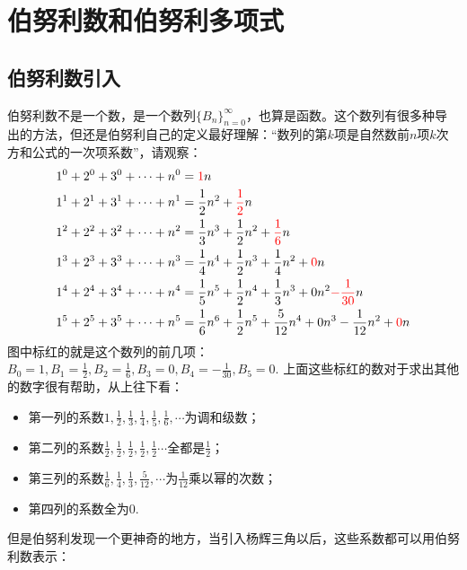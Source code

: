 \documentclass[UTF8]{ctexart}
\begin{document}
\section{伯努利数和伯努利多项式}

\subsection{伯努利数引入}

伯努利数不是一个数，是一个数列\(\{B_n\}_{n=0}^{\infty}\)，也算是函数。这个数列有很多种导出的方法，但还是伯努利自己的定义最好理解：“数列的第\(k\)项是自然数前\(n\)项\(k\)次方和公式的一次项系数”，请观察：
\begin{align*}
    1^0+2^0+3^0+ \cdots +n^0 &= {\color{red} 1}n \\
    1^1+2^1+3^1+ \cdots +n^1 &= \frac{1}{2}n^2+{\color{red} \frac{1}{2}}n \\
    1^2+2^2+3^2+ \cdots +n^2 &= \frac{1}{3}n^3+\frac{1}{2}n^2+{\color{red} \frac{1}{6}}n \\
    1^3+2^3+3^3+ \cdots +n^3 &= \frac{1}{4}n^4+\frac{1}{2}n^3+\frac{1}{4}n^2+{\color{red} 0}n \\
    1^4+2^4+3^4+ \cdots +n^4 &= \frac{1}{5}n^5+\frac{1}{2}n^4+\frac{1}{3}n^3+0n^2{\color{red} -\frac{1}{30}}n \\
    1^5+2^5+3^5+ \cdots +n^5 &= \frac{1}{6}n^6+\frac{1}{2}n^5+\frac{5}{12}n^4+0n^3-\frac{1}{12}n^2+{\color{red} 0}n
\end{align*}
图中标红的就是这个数列的前几项：\(\displaystyle{B_0=1, B_1=\frac{1}{2}, B_2=\frac{1}{6}, B_3=0, B_4=-\frac{1}{30}, B_5=0}\). 上面这些标红的数对于求出其他的数字很有帮助，从上往下看：
\begin{itemize}
    \item [] 第一列的系数\(\displaystyle{1, \frac{1}{2}, \frac{1}{3}, \frac{1}{4}, \frac{1}{5}, \frac 1 6, \cdots}\)为调和级数；
    \item [] 第二列的系数\(\displaystyle{\frac{1}{2}, \frac{1}{2}, \frac{1}{2}, \frac{1}{2}, \frac 1 2 \cdots}\)全都是\(\displaystyle{\frac{1}{2}}\)；
    \item [] 第三列的系数\(\displaystyle{\frac 1 6, \frac 1 4, \frac 1 3, \frac{5}{12}, \cdots}\)为\(\displaystyle{\frac{1}{12}}\)乘以幂的次数；
    \item [] 第四列的系数全为\(0\).
\end{itemize}
但是伯努利发现一个更神奇的地方，当引入杨辉三角以后，这些系数都可以用伯努利数表示：
\end{document}
